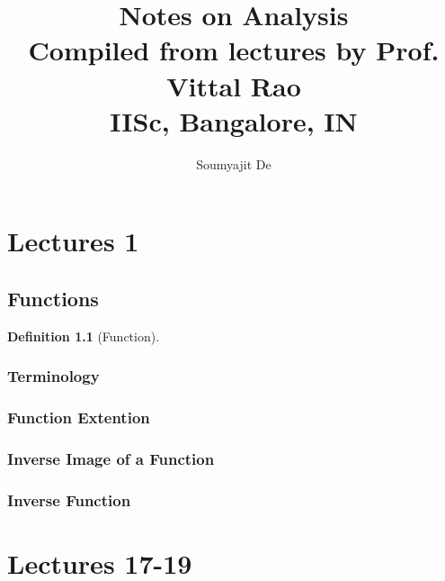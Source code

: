\documentclass{report}
\theoremstyle{plain}
\theoremstyle{definition}
\newtheorem{definition}[theorem]{Definition} %
\begin{document}
\title{Notes on Analysis\\
	\Large Compiled from lectures by Prof. Vittal Rao\\
	\large IISc, Bangalore, IN}
\author{Soumyajit De}

\maketitle
\chapter{Lectures 1}
\section{Functions}
\begin{definition}[Function]
\end{definition}
\subsection{Terminology}
\subsection{Function Extention}
\subsection{Inverse Image of a Function}
\subsection{Inverse Function}

\chapter{Lectures 17-19}
\end{document}
